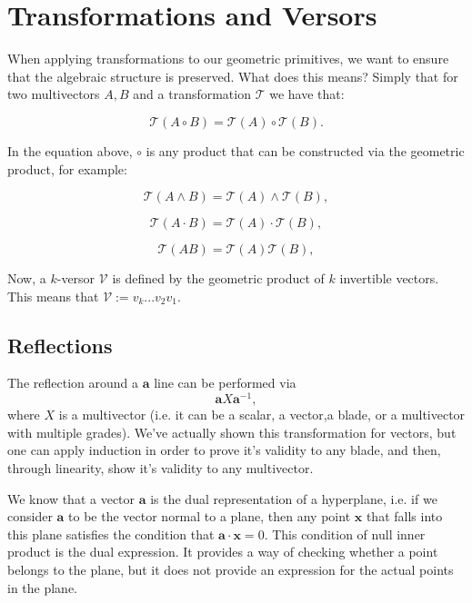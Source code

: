\section{Transformations and Versors}


When applying transformations to our geometric primitives, we want to ensure that
the algebraic structure is preserved. What does this means? Simply that for two
multivectors $A,B$ and a transformation $\mathcal T$ we have that:

\begin{displaymath}
    \mathcal T(A \circ B) = \mathcal T(A) \circ \mathcal T(B).
\end{displaymath}

In the equation above, $\circ$ is any product that can be constructed via the geometric product, for example:

\begin{displaymath}
    \mathcal T(A \wedge B) = \mathcal T(A) \wedge \mathcal T(B),
\end{displaymath}

\begin{displaymath}
    \mathcal T(A \cdot B) = \mathcal T(A) \cdot \mathcal T(B),
\end{displaymath}

\begin{displaymath}
    \mathcal T(A B) = \mathcal T(A) \mathcal T(B),
\end{displaymath}

Now, a $k$-versor $\mathcal V$ is defined by the geometric product of $k$ invertible vectors. This means that
$\mathcal V := v_k ... v_2 v_1$.


\subsection{Reflections}

The reflection around a $\mathbf a$ line can be performed via
\begin{displaymath}
    \mathbf a X \mathbf a^{-1},
\end{displaymath}
where $X$ is a multivector (i.e. it can be a scalar, a vector,a  blade, or a multivector with multiple grades).
We've actually shown this transformation for vectors, but one can apply induction in order to prove
it's validity to any blade, and then, through linearity, show it's validity to any multivector.

We know that a vector $\mathbf a$ is the dual representation of a hyperplane, i.e. if
we consider $\mathbf a$ to be the vector normal to a plane, then any point $\mathbf x$
that falls into this plane satisfies the condition that $\mathbf a \cdot \mathbf x = 0$.
This condition of null inner product is the dual expression. It provides a way of checking
whether a point belongs to the plane, but it does not provide an expression for the actual
points in the plane.

